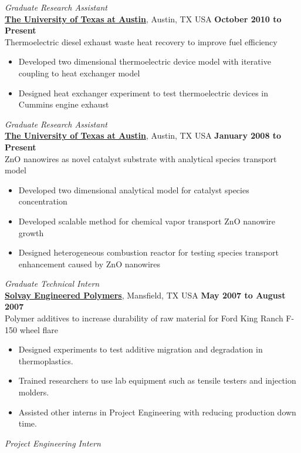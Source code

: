 \documentclass[centered]{res}
\begin{document}
\begin{resume}
\textit{Graduate Research Assistant} \\
\href{http://www.utexas.edu/}{\textbf{The University of Texas at
    Austin}}, Austin, TX USA%
\hfill \textbf{October 2010 to Present} \\
Thermoelectric diesel exhaust waste heat recovery to improve fuel
efficiency
\begin{itemize}
\item Developed two dimensional thermoelectric device model with
  iterative coupling to heat exchanger model
\item Designed heat exchanger experiment to test thermoelectric
  devices in Cummins engine exhaust
\end{itemize}
%
\textit{Graduate Research Assistant} \\
\href{http://www.utexas.edu/}{\textbf{The University of Texas at
    Austin}}, Austin, TX USA%
\hfill \textbf{January 2008 to Present} \\
ZnO nanowires as novel catalyst substrate with analytical species
transport model
\begin{itemize} \itemsep -2pt %
\item Developed two dimensional analytical model for catalyst
  species concentration
\item Developed scalable method for chemical vapor transport ZnO
  nanowire growth
\item Designed heterogeneous combustion reactor for testing species
  transport enhancement caused by ZnO nanowires
\end{itemize} 
%
\textit{Graduate Technical Intern} \\
\href{http://www.lyondellbasell.com/LandingPages/SolvayEngineeredPolymers}{\textbf{Solvay
    Engineered Polymers}}, Mansfield, TX USA 
\hfill \textbf{May 2007 to August 2007} \\
Polymer additives to increase durability of raw material for Ford King
Ranch F-150 wheel flare
\begin{itemize} \itemsep -2pt %
\item Designed experiments to test additive migration
  and degradation in thermoplastics.
\item Trained researchers to use lab equipment such as tensile
  testers and injection molders.
\item Assisted other interns in Project Engineering with
  reducing production down time.
\end{itemize}
%
\newpage{} 
%
\textit{Project Engineering Intern} \\

\end{resume}
\end{document}
